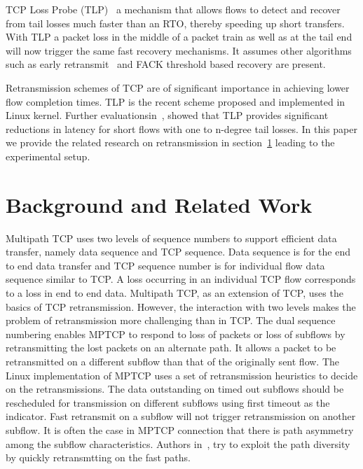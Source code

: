 \documentclass[10pt,draftcls,twocolumn]{IEEEconf}
\begin{document}
TCP Loss Probe (TLP)~\cite{Flach:2013} a mechanism that allows flows to detect and recover from tail losses much faster than an RTO, thereby speeding up short transfers. With TLP a packet loss in the middle 
of a packet train as well as at the tail end will now trigger the same fast recovery mechanisms. It assumes other algorithms such as early retransmit~\cite{rfc5827} and FACK threshold based recovery are 
present.


Retransmission schemes of TCP are of significant importance in achieving lower flow completion times. TLP is the recent scheme proposed and implemented in Linux kernel. Further 
evaluationsin~\cite{Rajiullah:2015}, showed that TLP provides significant reductions in latency for short flows with one to n-degree tail losses. In this paper we provide the related research on retransmission in section~\ref{relwork} leading to the experimental setup.

\section{Background and Related Work}\label{relwork}

Multipath TCP uses two levels of sequence numbers to support efficient data transfer, namely data sequence and TCP sequence. Data sequence is for the end to end data transfer and TCP sequence number is for individual flow data sequence similar to TCP. A loss occurring in an individual TCP flow corresponds to a loss in end to end data. Multipath TCP, as an extension of TCP, uses the basics of TCP retransmission. However, the interaction with two levels makes the problem of retransmission more challenging than in TCP. The dual sequence numbering enables MPTCP to respond to loss of packets or loss of subflows by retransmitting the lost packets on an alternate path. It allows a packet to be retransmitted on a different subflow than that of the originally sent flow. The Linux implementation of MPTCP uses a set of retransmission heuristics to decide on the retransmissions. The data outstanding on timed out subflows should be rescheduled for transmission on different subflows using first timeout as the indicator. Fast retransmit on a subflow will not trigger retransmission on another subflow. It is often the case in MPTCP connection that there is path asymmetry among the subflow characteristics. Authors in~\cite{fuso}, try to exploit the path diversity by quickly retransmtting on the fast paths. 
\end{document}
